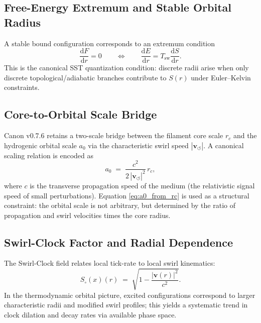 \documentclass[10pt]{article}
\newcommand{\swirlfactor}{S_\circ(x)}
\begin{document}
\subsection{Free-Energy Extremum and Stable Orbital Radius}

A stable bound configuration corresponds to an extremum condition
\begin{equation}
    \frac{\mathrm{d}F}{\mathrm{d}r} = 0
    \qquad\Longleftrightarrow\qquad
    \frac{\mathrm{d}E}{\mathrm{d}r} = T_{\mathrm{sw}}\frac{\mathrm{d}S}{\mathrm{d}r}.
    \label{eq:Fextremum}
\end{equation}
This is the canonical SST quantization condition: discrete radii arise when
only discrete topological/adiabatic branches contribute to $S(r)$ under
Euler--Kelvin constraints.

\subsection{Core-to-Orbital Scale Bridge}

Canon v0.7.6 retains a two-scale bridge between the filament core scale $r_c$
and the hydrogenic orbital scale $a_0$ via the characteristic swirl speed
$|\mathbf{v}_{\circlearrowleft}|$. A canonical scaling relation is encoded as
\begin{equation}
    a_0
    \;=\;
    \frac{c^2}{2\,|\mathbf{v}_{\circlearrowleft}|^2}\,r_c,
    \label{eq:a0_from_rc}
\end{equation}
where $c$ is the transverse propagation speed of the medium (the relativistic
signal speed of small perturbations). Equation \eqref{eq:a0_from_rc} is used as
a structural constraint: the orbital scale is not arbitrary, but determined by
the ratio of propagation and swirl velocities times the core radius.

\subsection{Swirl-Clock Factor and Radial Dependence}

The Swirl-Clock field relates local tick-rate to local swirl kinematics:
\begin{equation}
    \swirlfactor(r)
    \;=\;
    \sqrt{1 - \frac{|\mathbf{v}(r)|^2}{c^2}}.
\end{equation}
In the thermodynamic orbital picture, excited configurations correspond to
larger characteristic radii and modified swirl profiles; this yields a
systematic trend in clock dilation and decay rates via available phase space.
\end{document}
